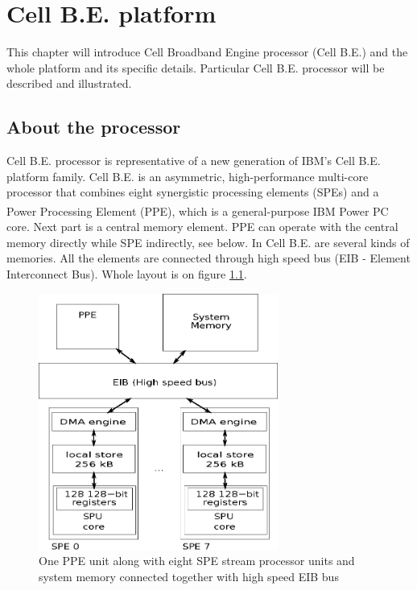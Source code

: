 \chapter{Cell B.E. platform}

This chapter will introduce Cell Broadband Engine processor (Cell B.E.) and the whole platform and its specific details.
Particular Cell B.E. processor will be described and illustrated.

\section{About the processor}

Cell B.E. processor is representative of a new generation of IBM's Cell B.E. platform family.
Cell B.E. is an asymmetric, high-performance multi-core processor that combines eight synergistic processing elements (SPEs) and a Power Processing Element (PPE), which is a general-purpose IBM Power PC\textsuperscript{\textregistered} core.
Next part is a central memory element.
PPE can operate with the central memory directly while SPE indirectly, see below.
In Cell B.E. are several kinds of memories.
All the elements are connected through high speed bus (EIB - Element Interconnect Bus).
Whole layout is on figure \ref{fg:processorLayout}.

\begin{figure}
    \centering
    \includegraphics[width=0.7\textwidth]{data/cellLayout}
    \caption[Cell B.E. processor layout]{One PPE unit along with eight SPE stream processor units and system memory connected together with high speed EIB bus}
    \label{fg:processorLayout}
\end{figure}

